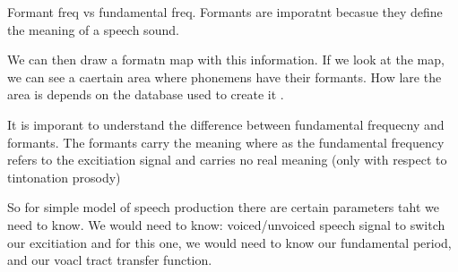 Formant freq vs fundamental freq.  
Formants are imporatnt becasue they define the meaning of a speech sound.

We can then draw a formatn map with this information.  If we look at the map, we can see a caertain area  where phonemens have their formants. How lare the area is depends on the database used to create it .

It is imporant to understand the difference between fundamental frequecny and formants.  The formants carry the meaning where as the fundamental frequency refers to the excitiation signal and carries no real meaning (only with respect to tintonation prosody)

So for simple model of speech production there are certain parameters taht we need to know.  We would need to know: voiced/unvoiced speech signal to switch our excitiation and for this one, we would need to know our fundamental period, and our voacl tract transfer function.

